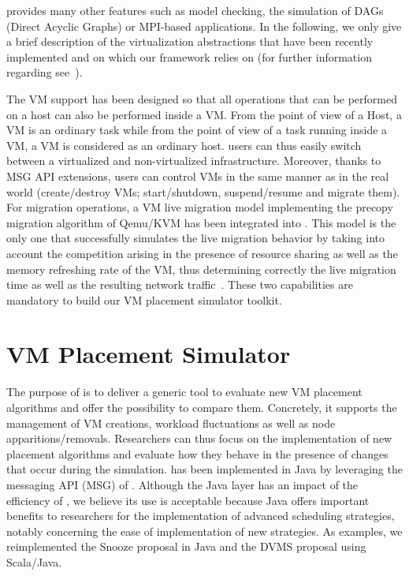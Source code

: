 \sg provides many other features such as model checking, the
simulation of DAGs (Direct Acyclic Graphs) or MPI-based
applications. In the following, we only give a brief description of
the virtualization abstractions that have been recently implemented
and on which our framework relies on (for further information regarding
\sg see~\cite{casanova:hal-01017319}).

The VM support has been designed so that all operations that can be
performed on a host can also be performed inside a VM. From the point
of view of a \sg Host, a \sg VM is an ordinary task while from the
point of view of a task running inside a \sg VM, a VM is considered as
an ordinary host.
\sg users can thus easily switch between a virtualized and
non-virtualized infrastructure.  Moreover, thanks to MSG API
extensions, users can control VMs in the same manner as in the real
world (\eg create/destroy VMs; start/shutdown, suspend/resume and
migrate them).
For migration operations, a VM live migration model implementing the
precopy migration algorithm of Qemu/KVM has been integrated into \sg.
This model is the only one that successfully simulates the live
migration behavior by taking into account the competition arising in
the presence of resource sharing as well as the memory refreshing rate
of the VM, thus determining correctly the live migration time as well
as the resulting network
traffic~\cite{Hirofuchi:2013:ALM:2568486.2568524}.
%
%
These two capabilities are mandatory to build our VM placement
simulator toolkit.

\section{VM Placement Simulator}
\label{sec:injector}

The purpose of \vmps is to deliver a generic tool to evaluate new VM
placement algorithms and offer the possibility to compare
them. Concretely, it supports the management of VM creations, workload
fluctuations as well as node apparitions/removals.  Researchers can
thus focus on the implementation of new placement algorithms and
evaluate how they behave in the presence of changes that occur during
the simulation.
%
\vmps has been implemented in Java by leveraging the messaging API
(MSG) of \sg. Although the Java layer has an impact of the efficiency
of \sg, we believe its use is acceptable because Java offers important
benefits to researchers for the implementation of advanced scheduling
strategies, notably concerning the ease of implementation of new
strategies. As examples, we reimplemented the Snooze proposal in Java
and the DVMS proposal using Scala/Java.

